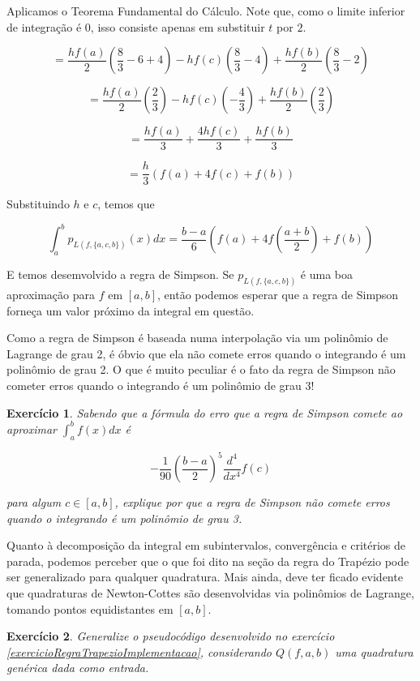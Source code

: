 \documentclass[]{article}
\newtheorem{exercicio}{Exercício}
\numberwithin{equation}{section}
\begin{document}
Aplicamos o Teorema Fundamental do Cálculo.  Note que, como o limite
inferior de integração é $0$, isso consiste apenas em substituir $t$
por $2$.

$$
= \frac{hf(a)}{2} \left(\frac{8}{3} - 6 + 4\right) - hf(c) \left(\frac{8}{3} - 4\right) + \frac{hf(b)}{2} \left(\frac{8}{3} - 2\right)
$$

$$
= \frac{hf(a)}{2} \left(\frac{2}{3}\right) - hf(c) \left(-\frac{4}{3}\right) + \frac{hf(b)}{2} \left(\frac{2}{3}\right)
$$

$$
= \frac{hf(a)}{3} + \frac{4hf(c)}{3} + \frac{hf(b)}{3}
$$

$$
= \frac{h}{3} (f(a) + 4f(c) + f(b))
$$

Substituindo $h$ e $c$, temos que

$$
\int_{a}^{b} p_{L(f, \{a, c, b\})}(x) dx = \frac{b - a}{6} \left(f(a) + 4f\left(\frac{a + b}{2}\right) + f(b)\right)
$$

E temos desemvolvido a regra de Simpson. Se $p_{L(f, \{a, c, b\})}$ é
uma boa aproximação para $f$ em $[a, b]$, então podemos esperar que a
regra de Simpson forneça um valor próximo da integral em questão.

Como a regra de Simpson é baseada numa interpolação via um polinômio
de Lagrange de grau 2, é óbvio que ela não comete erros quando o
integrando é um polinômio de grau 2. O que é muito peculiar é o fato
da regra de Simpson não cometer erros quando o integrando é um
polinômio de grau 3!

\begin{exercicio}
	Sabendo que a fórmula do erro que a regra de Simpson comete ao aproximar $\int_{a}^{b} f(x) dx$ é

$$
- \frac{1}{90} \left(\frac{b - a}{2}\right)^5 \frac{d^4}{dx^4} f(c)
$$

	para algum $c \in [a, b]$, explique por que a regra de Simpson não comete erros quando o integrando é um polinômio de grau 3.
\end{exercicio}

Quanto à decomposição da integral em subintervalos, convergência e
critérios de parada, podemos perceber que o que foi dito na seção da
regra do Trapézio pode ser generalizado para qualquer quadratura. Mais
ainda, deve ter ficado evidente que quadraturas de Newton-Cottes são
desenvolvidas via polinômios de Lagrange, tomando pontos equidistantes
em $[a, b]$.

\begin{exercicio}
  Generalize o pseudocódigo desenvolvido no exercício
  \ref{exercicioRegraTrapezioImplementacao}, considerando $Q(f, a, b)$
  uma quadratura genérica dada como entrada.
\end{exercicio}
\end{document}
